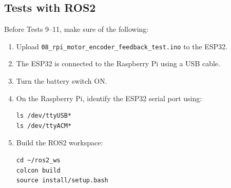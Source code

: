 \documentclass[12pt]{article}
\begin{document}
\subsection{Tests with ROS2}
Before Tests 9--11, make sure of the following:
\begin{enumerate}
    \item Upload \texttt{08\_rpi\_motor\_encoder\_feedback\_test.ino} to the ESP32.
    \item The ESP32 is connected to the Raspberry Pi using a USB cable.
    \item Turn the battery switch ON.
    \item On the Raspberry Pi, identify the ESP32 serial port using:
    \begin{verbatim}
ls /dev/ttyUSB*
ls /dev/ttyACM*
    \end{verbatim}
    \item Build the ROS2 workspace:
    \begin{verbatim}
cd ~/ros2_ws
colcon build
source install/setup.bash
    \end{verbatim}
\end{enumerate}
\end{document}
